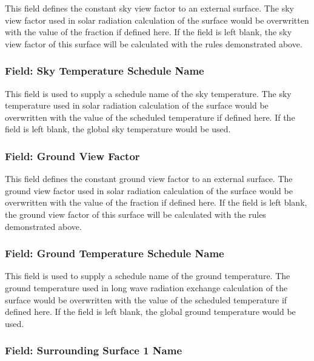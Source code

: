This field defines the constant sky view factor to an external surface. The sky view factor used in solar radiation calculation of the surface would be overwritten with the value of the fraction if defined here. If the field is left blank, the sky view factor of this surface will be calculated with the rules demonstrated above.

\subsubsection{Field: Sky Temperature Schedule Name}\label{field-sky-temperature-schedule-name}

This field is used to supply a schedule name of the sky temperature. The sky temperature used in solar radiation calculation of the surface would be overwritten with the value of the scheduled temperature if defined here. If the field is left blank, the global sky temperature would be used.

\subsubsection{Field: Ground View Factor}\label{field-ground-view-factor}

This field defines the constant ground view factor to an external surface. The ground view factor used in solar radiation calculation of the surface would be overwritten with the value of the fraction if defined here. If the field is left blank, the ground view factor of this surface will be calculated with the rules demonstrated above.

\subsubsection{Field: Ground Temperature Schedule Name}\label{field-ground-temperature-schedule-name}

This field is used to supply a schedule name of the ground temperature. The ground temperature used in long wave radiation exchange calculation of the surface would be overwritten with the value of the scheduled temperature if defined here. If the field is left blank, the global ground temperature would be used.

\subsubsection{Field: Surrounding Surface 1 Name}\label{field-surrounding-surface-1-name}

